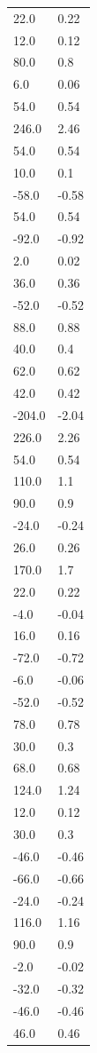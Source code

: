 \begin{longtable}{ll}
22.0 & 0.22 \\
12.0 & 0.12 \\
80.0 & 0.8 \\
6.0 & 0.06 \\
54.0 & 0.54 \\
246.0 & 2.46 \\
54.0 & 0.54 \\
10.0 & 0.1 \\
-58.0 & -0.58 \\
54.0 & 0.54 \\
-92.0 & -0.92 \\
2.0 & 0.02 \\
36.0 & 0.36 \\
-52.0 & -0.52 \\
88.0 & 0.88 \\
40.0 & 0.4 \\
62.0 & 0.62 \\
42.0 & 0.42 \\
-204.0 & -2.04 \\
226.0 & 2.26 \\
54.0 & 0.54 \\
110.0 & 1.1 \\
90.0 & 0.9 \\
-24.0 & -0.24 \\
26.0 & 0.26 \\
170.0 & 1.7 \\
22.0 & 0.22 \\
-4.0 & -0.04 \\
16.0 & 0.16 \\
-72.0 & -0.72 \\
-6.0 & -0.06 \\
-52.0 & -0.52 \\
78.0 & 0.78 \\
30.0 & 0.3 \\
68.0 & 0.68 \\
124.0 & 1.24 \\
12.0 & 0.12 \\
30.0 & 0.3 \\
-46.0 & -0.46 \\
-66.0 & -0.66 \\
-24.0 & -0.24 \\
116.0 & 1.16 \\
90.0 & 0.9 \\
-2.0 & -0.02 \\
-32.0 & -0.32 \\
-46.0 & -0.46 \\
46.0 & 0.46 \\

\end{longtable}
